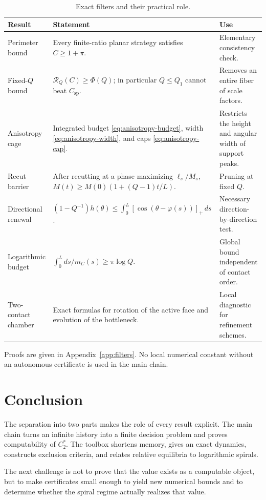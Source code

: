 \documentclass[10pt,a4paper]{article}
\theoremstyle{definition}
\theoremstyle{remark}
\newcommand{\cellratio}{\mathcal{R}}
\newcommand{\spc}{C_{\mathrm{sp}}}
\begin{document}
\begin{table}[ht]
\centering
\small
\caption{Exact filters and their practical role.}
\label{tab:filters}
\begin{tabularx}{\textwidth}{@{}p{3.2cm}X X@{}}
\toprule
Result & Statement & Use \\
\midrule
Perimeter bound & Every finite-ratio planar strategy satisfies $C\ge1+\pi$. & Elementary consistency check. \\
Fixed-$Q$ bound & $\cellratio_Q(C)\ge\Phi(Q)$; in particular $Q\le Q_1$ cannot beat $\spc$. & Removes an entire fiber of scale factors. \\
Anisotropy cage & Integrated budget \eqref{eq:anisotropy-budget}, width \eqref{eq:anisotropy-width}, and caps \eqref{eq:anisotropy-cap}. & Restricts the height and angular width of support peaks. \\
Recut barrier & After recutting at a phase maximizing $\ell_s/M_s$, $M(t)\ge M(0)(1+(Q-1)t/L)$. & Pruning at fixed $Q$. \\
Directional renewal & $(1-Q^{-1})h(\theta)\le\int_0^L[\cos(\theta-\varphi(s))]_+\,ds$. & Necessary direction-by-direction test. \\
Logarithmic budget & $\int_0^L ds/m_C(s)\ge\pi\log Q$. & Global bound independent of contact order. \\
Two-contact chamber & Exact formulas for rotation of the active face and evolution of the bottleneck. & Local diagnostic for refinement schemes. \\

\bottomrule
\end{tabularx}
\end{table}

Proofs are given in Appendix~\ref{app:filters}. No local numerical constant without an autonomous certificate is used in the main chain.

\section{Conclusion}
The separation into two parts makes the role of every result explicit. The main chain turns an infinite history into a finite decision problem and proves computability of $C_2^*$. The toolbox shortens memory, gives an exact dynamics, constructs exclusion criteria, and relates relative equilibria to logarithmic spirals.

The next challenge is not to prove that the value exists as a computable object, but to make certificates small enough to yield new numerical bounds and to determine whether the spiral regime actually realizes that value.
\end{document}
